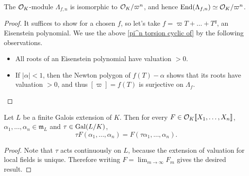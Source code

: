 \begin{proposition}
    The $\mathcal{O}_K$-module $\Lambda_{f, n}$ is isomorphic to $\mathcal{O}_K/\varpi^n$, and hence $\operatorname{End}(\Lambda_{f, n})\simeq \mathcal{O}_K/\varpi^n$.
\end{proposition}
\begin{proof}
    It suffices to show for a chosen $f$, so let's take $f = \varpi T + \dots + T^q$, an Eisenstein polynomial.
    We use the above \cref{pi^n torsion cyclic of} by the following observations.\begin{itemize}
        \item All roots of an Eisenstein polynomial have valuation $>0$.
        \item If $|\alpha| < 1$, then the Newton polygon of $f(T) - \alpha$ shows that its roots have valuation $>0$, and thus $[\varpi] = f(T)$ is surjective on $\Lambda_f$.\qedhere
    \end{itemize}
\end{proof}

\begin{lemma}\label{galois commutes power series}
    Let $L$ be a finite Galois extension of $K$. Then for every $F\in\mathcal{O}_K\llbracket X_1, \dots, X_n \rrbracket$, $\alpha_1,\dots, \alpha_n\in\mathfrak{m}_L$ and $\tau\in\operatorname{Gal}(L/K)$,
    \[\tau F(\alpha_1, \dots, \alpha_n) = F(\tau\alpha_1, \dots, \alpha_n).\]
\end{lemma}
\begin{proof}
    Note that $\tau$ acts continuously on $L$, because the extension of valuation for local fields is unique.
    Therefore writing $F = \lim_{m\to\infty} F_m$ gives the desired result.
\end{proof}

